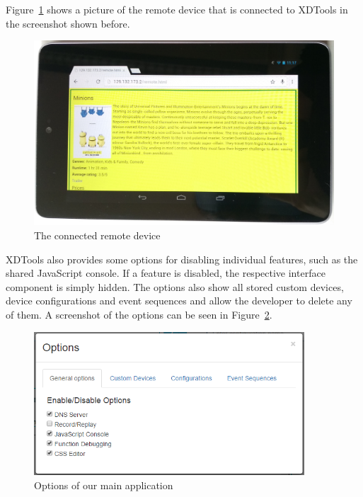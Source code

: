 Figure~\ref{fig:complete_remote} shows a picture of the remote device that is connected to XDTools in the screenshot shown before.

\begin{figure}[H]
  \centering
    \includegraphics[width=1.0\textwidth]{images/screenshots/remote_device.jpg}
	\caption[Screenshot: Remote Device]{The connected remote device}
	\label{fig:complete_remote}
\end{figure}

XDTools also provides some options for disabling individual features, such as the shared JavaScript console. If a feature is disabled, the respective interface component is simply hidden. The options also show all stored custom devices, device configurations and event sequences and allow the developer to delete any of them. A screenshot of the options can be seen in Figure~\ref{fig:options}.

\begin{figure}[H]
  \centering
    \includegraphics[width=0.9\textwidth]{images/screenshots/options.png}
	\caption[Screenshot: Options]{Options of our main application}
	\label{fig:options}
\end{figure}

